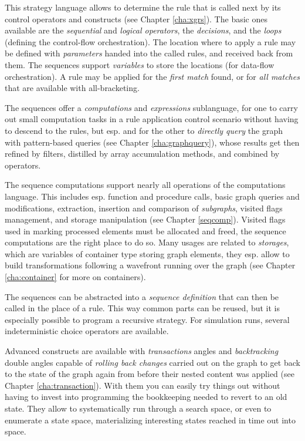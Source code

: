 This strategy language allows to determine the rule that is called next by its control operators and constructs (see Chapter \ref{cha:xgrs}).
The basic ones available are the \emph{sequential} and \emph{logical operators}, the \emph{decisions}, and the \emph{loops} (defining the control-flow orchestration).
The location where to apply a rule may be defined with \emph{parameters} handed into the called rules, and received back from them. 
The sequences support \emph{variables} to store the locations (for data-flow orchestration).
A rule may be applied for the \emph{first match} found, or for \emph{all matches} that are available with all-bracketing.

The sequences offer a \emph{computations} and \emph{expressions} sublanguage,
for one to carry out small computation tasks in a rule application control scenario without having to descend to the rules, but esp. and for the other to \emph{directly query} the graph with pattern-based queries (see Chapter \ref{cha:graphquery}), whose results get then refined by filters, distilled by array accumulation methods, and combined by operators.

The sequence computations support nearly all operations of the computations language.
This includes esp. function and procedure calls, basic graph queries and modifications, extraction, insertion and comparison of \emph{subgraphs}, visited flags management, and storage manipulation (see Chapter \ref{seqcomp}).
Visited flags used in marking processed elements must be allocated and freed, the sequence computations are the right place to do so.
Many usages are related to \emph{storages}, which are variables of container type storing graph elements, they esp. allow to build transformations following a wavefront running over the graph (see Chapter \ref{cha:container} for more on containers).

The sequences can be abstracted into a \emph{sequence definition} that can then be called in the place of a rule.
This way common parts can be reused, but it is especially possible to program a recursive strategy.
For simulation runs, several indeterministic choice operators are available.

Advanced constructs are available with \emph{transactions} angles and \emph{backtracking} double angles capable of \emph{rolling back changes} carried out on the graph to get back to the state of the graph again from before their nested content was applied (see Chapter \ref{cha:transaction}).
With them you can easily try things out without having to invest into programming the bookkeeping needed to revert to an old state.
They allow to systematically run through a search space, or even to enumerate a state space, materializing interesting states reached in time out into space.

